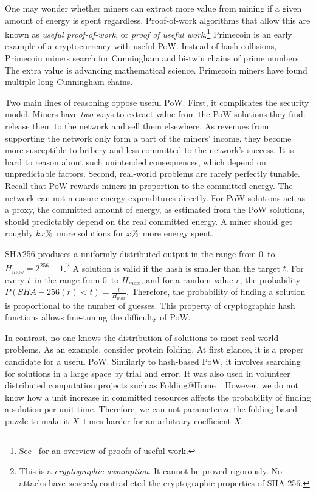 One may wonder whether miners can extract more value from mining if a given amount of energy is spent regardless.
Proof-of-work algorithms that allow this are known as \textit{useful proof-of-work}, or \textit{proof of useful work}.\footnote{See~\cite{Ball2017} for an overview of proofs of useful work.}
Primecoin is an early example of a cryptocurrency with useful PoW.
Instead of hash collisions, Primecoin miners search for Cunningham and bi-twin chains of prime numbers.
The extra value is advancing mathematical science.
Primecoin miners have found multiple long Cunningham chains.

Two main lines of reasoning oppose useful PoW.
First, it complicates the security model.
Miners have \textit{two} ways to extract value from the PoW solutions they find: release them to the network and sell them elsewhere.
As revenues from supporting the network only form a part of the miners' income, they become more susceptible to bribery and less committed to the network's success.
It is hard to reason about such unintended consequences, which depend on unpredictable factors.
Second, real-world problems are rarely perfectly tunable.
Recall that PoW rewards miners in proportion to the committed energy.
The network can not measure energy expenditures directly.
For PoW solutions act as a proxy, the committed amount of energy, as estimated from the PoW solutions, should predictably depend on the real committed energy.
A miner should get roughly $kx\%$~more solutions for $x\%$~more energy spent.

SHA256 produces a uniformly distributed output in the range from $0$~to $H_{max} = 2^{256}-1$.\footnote{This is a \textit{cryptographic assumption}. It cannot be proved rigorously. No attacks have \textit{severely} contradicted the cryptographic properties of SHA-256.}
A solution is valid if the hash is smaller than the target $t$.
For every $t$~in the range from $0$~to $H_{max}$, and for a random value $r$, the probability $P(SHA-256(r) < t) = \frac{t}{H_{max}}$.
Therefore, the probability of finding a solution is proportional to the number of guesses.
This property of cryptographic hash functions allows fine-tuning the difficulty of PoW.

In contrast, no one knows the distribution of solutions to most real-world problems.
As an example, consider protein folding.
At first glance, it is a proper candidate for a useful PoW.
Similarly to hash-based PoW, it involves searching for solutions in a large space by trial and error.
It was also used in volunteer distributed computation projects such as Folding@Home~\cite{Beberg2009}.
However, we do not know how a unit increase in committed resources affects the probability of finding a solution per unit time.
Therefore, we can not parameterize the folding-based puzzle to make it $X$~times harder for an arbitrary coefficient $X$.


